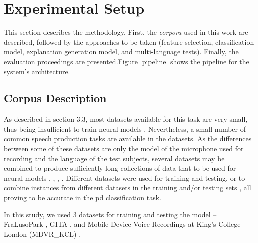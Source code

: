 
\chapter{Experimental Setup}
\label{ch:adipisci}



This section describes the methodology. First, the \textit{corpora} used in this work are described, followed by the approaches to be taken (feature selection, classification model, explanation generation model, and multi-language tests). Finally, the evaluation proceedings are presented.Figure \ref{pipeline} shows the pipeline for the system's architecture. 

\section{Corpus Description}

As described in section 3.3, most datasets available for this task are very small, thus being insufficient to train neural models \cite{underfitting_small_datasets}. Nevertheless, a small number of common speech production tasks are available in the datasets. As the differences between some of these datasets are only the model of the microphone used for recording and the language of the test subjects, several datasets may be combined to produce sufficiently long collections of data that to be used for neural models \cite{parkinson_braga}, \cite{parkinson_acoustic_despotovic}, \cite{parkinson_phonemic_relevance}, \cite{x_vector_parkinson}. Different datasets were used for training and testing, or to combine instances from different datasets in the training and/or testing sets \cite{parkinson_three_languages}, all proving to be accurate in the \gls{pd} classification task.

In this study, we used 3 datasets for training and testing the model -- FraLusoPark \cite{fralusopark}, GITA \cite{GITA}, and Mobile Device Voice Recordings at King's College London (MDVR\_KCL) \cite{MDVR}.

